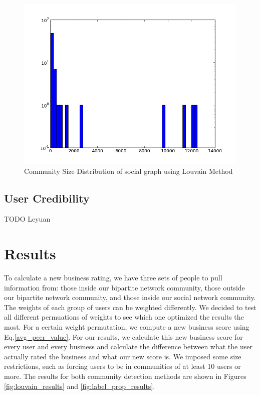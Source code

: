 \documentclass[10pt]{article}
\begin{document}
\begin{figure}[ht]
\includegraphics[scale=.4]{social_community_dist.png} 
\caption{Community Size Distribution of social graph using Louvain Method}
\label{fig:social_community_dist}
\endminipage\hfill
\end{figure}



\subsection{User Credibility}
\label{sec:user_credibility}

TODO Leyuan

\section{Results}
\label{sec:results}

To calculate a new business rating, we have three sets of people to pull information from: those inside our bipartite network community, those outside our bipartite network community, and those inside our social network community.  The weights of each group of users can be weighted differently.  We decided to test all different permuations of weights to see which one optimized the results the most.  For a certain weight permutation, we compute a new business score using Eq.\ref{avg_peer_value}.  For our results, we calculate this new business score for every user and every business and calculate the difference between what the user actually rated the business and what our new score is.  We imposed some size restrictions, such as forcing users to be in communities of at least 10 users or more.  The results for both community detection methods are shown in Figures \ref{fig:louvain_results} and \ref{fig:label_prop_results}.
\end{document}
